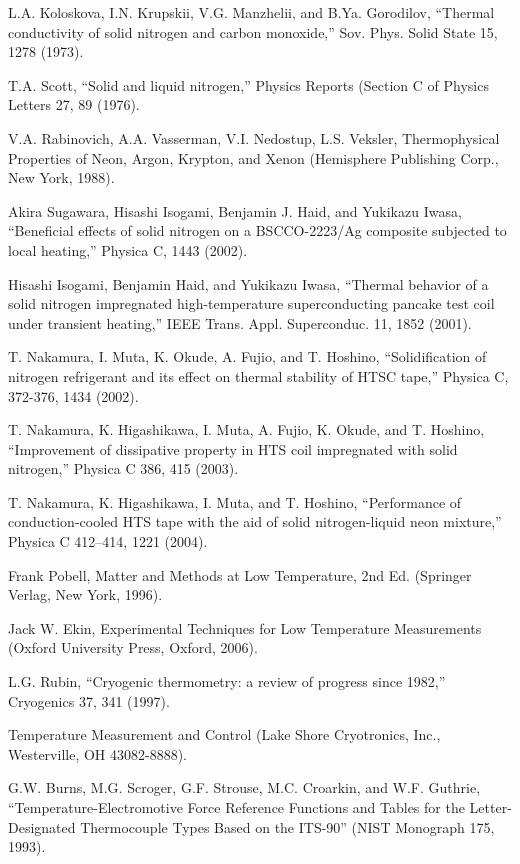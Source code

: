 \noindent [4.33] L.A. Koloskova, I.N. Krupskii, V.G. Manzhelii, and B.Ya. Gorodilov, ``Thermal
conductivity of solid nitrogen and carbon monoxide,” Sov. Phys. Solid State 15,
1278 (1973).

\noindent [4.34] T.A. Scott, ``Solid and liquid nitrogen,” Physics Reports (Section C of Physics
Letters 27, 89 (1976).

\noindent [4.35] V.A. Rabinovich, A.A. Vasserman, V.I. Nedostup, L.S. Veksler, Thermophysical Properties of Neon, Argon, Krypton, and Xenon (Hemisphere Publishing Corp.,
New York, 1988).

\noindent [4.36] Akira Sugawara, Hisashi Isogami, Benjamin J. Haid, and Yukikazu Iwasa, ``Beneficial effects of solid nitrogen on a BSCCO-2223/Ag composite subjected to local heating,” Physica C, 1443 (2002).

\noindent [4.37] Hisashi Isogami, Benjamin Haid, and Yukikazu Iwasa, ``Thermal behavior of a solid nitrogen impregnated high-temperature superconducting pancake test coil under
transient heating,” IEEE Trans. Appl. Superconduc. 11, 1852 (2001).

\noindent [4.38] T. Nakamura, I. Muta, K. Okude, A. Fujio, and T. Hoshino, ``Solidification of
nitrogen refrigerant and its effect on thermal stability of HTSC tape,” Physica C,
372-376, 1434 (2002).

\noindent [4.39] T. Nakamura, K. Higashikawa, I. Muta, A. Fujio, K. Okude, and T. Hoshino, ``Improvement of dissipative property in HTS coil impregnated with solid nitrogen,”
Physica C 386, 415 (2003).

\noindent [4.40] T. Nakamura, K. Higashikawa, I. Muta, and T. Hoshino, ``Performance of
conduction-cooled HTS tape with the aid of solid nitrogen-liquid neon mixture,”
Physica C 412–414, 1221 (2004).

\noindent [4.41] Frank Pobell, Matter and Methods at Low Temperature, 2nd Ed. (Springer Verlag,
New York, 1996).

\noindent [4.42] Jack W. Ekin, Experimental Techniques for Low Temperature Measurements (Oxford University Press, Oxford, 2006).

\noindent [4.43] L.G. Rubin, ``Cryogenic thermometry: a review of progress since 1982,” Cryogenics 37, 341 (1997).

\noindent [4.44] Temperature Measurement and Control (Lake Shore Cryotronics, Inc., Westerville, OH 43082-8888).

\noindent [4.45] G.W. Burns, M.G. Scroger, G.F. Strouse, M.C. Croarkin, and W.F. Guthrie,
``Temperature-Electromotive Force Reference Functions and Tables for the Letter-
Designated Thermocouple Types Based on the ITS-90” (NIST Monograph 175,
1993).

